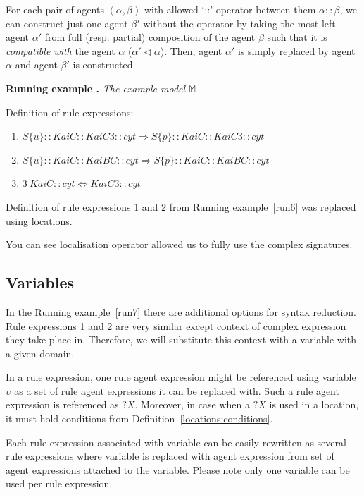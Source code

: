\documentclass[12pt]{fithesis2}
\newcounter{counter}[section]
\renewcommand{\thecounter}{\thesection.\arabic{counter}}
\newenvironment{runningExample}[1]{\bigskip\refstepcounter{counter}\noindent\textbf{Running example \thecounter} \emph{#1} \par\nopagebreak}{\bigskip}
\begin{document}
For each pair of agents $(\alpha, \beta)$ with allowed `::' operator between them $\alpha :: \beta$, we can construct just one agent $\beta'$ without the operator by taking the most left agent $\alpha'$ from full (resp. partial) composition of the agent $\beta$ such that it is \emph{compatible with} the agent $\alpha$ ($\alpha' \lhd \alpha$). Then, agent $\alpha'$ is simply replaced by agent $\alpha$ and agent $\beta'$ is constructed.

\begin{runningExample}{The example model $\mathds{M}$}
\label{run7}
\noindent Definition of rule expressions:
{\small
\begin{enumerate}
\item $S\{u\}::KaiC::KaiC3::cyt \Rightarrow S\{p\}::KaiC::KaiC3::cyt$
\item $S\{u\}::KaiC::KaiBC::cyt \Rightarrow S\{p\}::KaiC::KaiBC::cyt$
\item $3~KaiC::cyt \Leftrightarrow KaiC3::cyt$
\end{enumerate}
}
\end{runningExample}

\noindent Definition of rule expressions 1 and 2 from Running example~\ref{run6} was replaced using locations.

You can see localisation operator allowed us to fully use the complex signatures.

\subsection{Variables}

In the Running example~\ref{run7} there are additional options for syntax reduction. Rule expressions 1 and 2 are very similar except context of complex expression they take place in. Therefore, we will substitute this context with a variable with a given domain.

In a rule expression, one rule agent expression might be referenced using variable $\upsilon$ as a set of rule agent expressions it can be replaced with. Such a rule agent expression is referenced as $?X$. Moreover, in case when a $?X$ is used in a location, it must hold conditions from Definition~\ref{locations:conditions}.

Each rule expression associated with variable can be easily rewritten as several rule expressions where variable is replaced with agent expression from set of agent expressions attached to the variable. Please note only one variable can be used per rule expression.
\end{document}
